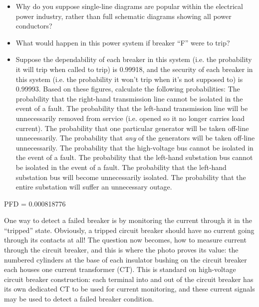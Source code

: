 \begin{itemize}
\item{} Why do you suppose single-line diagrams are popular within the electrical power industry, rather than full schematic diagrams showing all power conductors?
\item{} What would happen in this power system if breaker ``F'' were to trip?
\item{} Suppose the dependability of each breaker in this system (i.e. the probability it will trip when called to trip) is 0.99918, and the security of each breaker in this system (i.e. the probability it won't trip when it's not supposed to) is 0.99993.  Based on these figures, calculate the following probabilities:
\itemitem{} The probability that the right-hand transmission line cannot be isolated in the event of a fault.
\itemitem{} The probability that the left-hand transmission line will be unnecessarily removed from service (i.e. opened so it no longer carries load current).
\itemitem{} The probability that one particular generator will be taken off-line unnecessarily.
\itemitem{} The probability that {\it any} of the generators will be taken off-line unnecessarily.
\itemitem{} The probability that the high-voltage bus cannot be isolated in the event of a fault.
\itemitem{} The probability that the left-hand substation bus cannot be isolated in the event of a fault.
\itemitem{} The probability that the left-hand substation bus will become unnecessarily isolated.
\itemitem{} The probability that the entire substation will suffer an unnecessary outage.
\end{itemize}







PFD = 0.000818776

\vskip 10pt

One way to detect a failed breaker is by monitoring the current through it in the ``tripped'' state.  Obviously, a tripped circuit breaker should have no current going through its contacts at all!  The question now becomes, how to measure current through the circuit breaker, and this is where the photo proves its value: the numbered cylinders at the base of each insulator bushing on the circuit breaker each houses one current transformer (CT).  This is standard on high-voltage circuit breaker construction: each terminal into and out of the circuit breaker has its own dedicated CT to be used for current monitoring, and these current signals may be used to detect a failed breaker condition.

